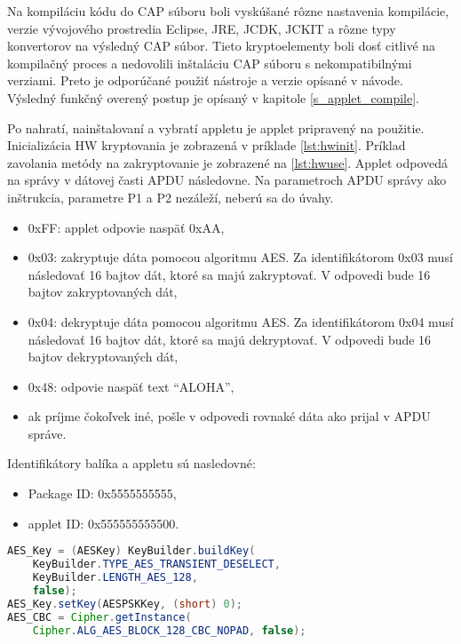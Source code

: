 \documentclass[12pt,a4wide,oneside,openright]{report}
\newcommand{\quotes}[1]{``#1''}
\begin{document}
	Na kompiláciu kódu do CAP súboru boli vyskúšané rôzne nastavenia kompilácie, verzie vývojového prostredia Eclipse, JRE, JCDK, JCKIT a rôzne typy konvertorov na výsledný CAP súbor. Tieto kryptoelementy boli dosť citlivé na kompilačný proces a nedovolili inštaláciu CAP súboru s nekompatibilnými verziami. Preto je odporúčané použiť nástroje a verzie opísané v návode. Výsledný funkčný overený postup je opísaný v kapitole \ref{s_applet_compile}.
	
	Po nahratí, nainštalovaní a vybratí appletu je applet pripravený na použitie. Inicializácia HW kryptovania je zobrazená v príklade \ref{lst:hwinit}. Príklad zavolania metódy na zakryptovanie je zobrazené na \ref{lst:hwuse}.  Applet odpovedá na správy v dátovej časti APDU následovne. Na parametroch APDU správy ako inštrukcia, parametre P1 a P2 nezáleží, neberú sa do úvahy.
	\singlespacing
	\begin{itemize}
		\item 0xFF: applet odpovie naspäť 0xAA,
		\item 0x03: zakryptuje dáta pomocou algoritmu AES. Za identifikátorom 0x03 musí následovať 16 bajtov dát, ktoré sa majú zakryptovať. V odpovedi bude 16 bajtov zakryptovaných dát,
		\item 0x04: dekryptuje dáta pomocou algoritmu AES. Za identifikátorom 0x04 musí následovať 16 bajtov dát, ktoré sa majú dekryptovať. V odpovedi bude 16 bajtov dekryptovaných dát,
		\item 0x48: odpovie naspäť text \quotes{ALOHA},
		\item ak príjme čokoľvek iné, pošle v odpovedi rovnaké dáta ako prijal v APDU správe.
	\end{itemize}
		\onehalfspacing
		
	Identifikátory balíka a appletu sú nasledovné:
	\singlespacing
	\begin{itemize}
		\item Package ID: \tabto{2.5cm}0x5555555555,		
		\item applet ID: \tabto{2.5cm}0x555555555500.
	\end{itemize}
		\onehalfspacing
	
	\begin{lstlisting}[caption={Inicializácia HW AES.}, label={lst:hwinit}, language=java] 
AES_Key = (AESKey) KeyBuilder.buildKey(
	KeyBuilder.TYPE_AES_TRANSIENT_DESELECT,
	KeyBuilder.LENGTH_AES_128,
	false);
AES_Key.setKey(AESPSKKey, (short) 0);
AES_CBC = Cipher.getInstance(
	Cipher.ALG_AES_BLOCK_128_CBC_NOPAD, false);
		\end{lstlisting}
	
\end{document}
